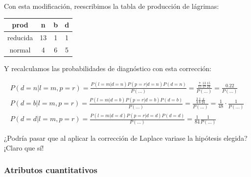\documentclass{apuntes}
\begin{document}
Con esta modificación, reescribimos la tabla de producción de lágrimas:
\begin{center}
\begin{tabular}{|c|c|c|c|}
\hline
prod & n&b&d\\\hline
reducida & 13 & 1 & 1\\\hline
normal &4&6&5\\\hline
\end{tabular}
\end{center}

Y recalculamos las probabilidades de diagnóstico con esta corrección:

\begin{gather*}
P(d=n | l=m,p=r) = \frac{P(l=m|d= n) P(p=r | d = n) P(d = n)}{P(...)} = \frac{\frac{7}{15}\frac{13}{17}\frac{15}{24}}{P(...)} = \frac{0.22}{P(...)}\\
P(d=b | l=m,p=r) = \frac{P(l=m|d= b) P(p=r | d = b) P(d = b)}{P(...)} = \frac{\frac{3}{4}\frac{1}{6}\frac{4}{24}}{P(...)} = \frac{1}{48}·\frac{1}{P(...)}\\
P(d=d | l=m,p=r) = \frac{P(l=m|d= d) P(p=r | d = d) P(d = d)}{P(...)} = \frac{1}{84}\frac{1}{P(...)}
\end{gather*}

¿Podría pasar que al aplicar la corrección de Laplace variase la hipótesis elegida? ¡Claro que sí! 


\subsubsection{Atributos cuantitativos} 
\end{document}
